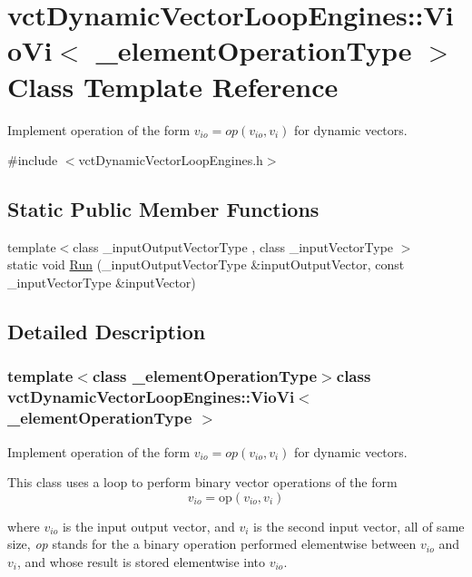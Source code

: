 \hypertarget{classvct_dynamic_vector_loop_engines_1_1_vio_vi}{\section{vct\-Dynamic\-Vector\-Loop\-Engines\-:\-:Vio\-Vi$<$ \-\_\-element\-Operation\-Type $>$ Class Template Reference}
\label{classvct_dynamic_vector_loop_engines_1_1_vio_vi}
}


Implement operation of the form $v_{io} = op(v_{io}, v_i)$ for dynamic vectors.  




{\ttfamily \#include $<$vct\-Dynamic\-Vector\-Loop\-Engines.\-h$>$}

\subsection*{Static Public Member Functions}
\begin{DoxyCompactItemize}
\item 
{\footnotesize template$<$class \-\_\-input\-Output\-Vector\-Type , class \-\_\-input\-Vector\-Type $>$ }\\static void \hyperlink{classvct_dynamic_vector_loop_engines_1_1_vio_vi_ae0a793b8eb6981b09ec9257a2bd144f9}{Run} (\-\_\-input\-Output\-Vector\-Type \&input\-Output\-Vector, const \-\_\-input\-Vector\-Type \&input\-Vector)
\end{DoxyCompactItemize}


\subsection{Detailed Description}
\subsubsection*{template$<$class \-\_\-element\-Operation\-Type$>$class vct\-Dynamic\-Vector\-Loop\-Engines\-::\-Vio\-Vi$<$ \-\_\-element\-Operation\-Type $>$}

Implement operation of the form $v_{io} = op(v_{io}, v_i)$ for dynamic vectors. 

This class uses a loop to perform binary vector operations of the form \[ v_{io} = \mathrm{op}(v_{io}, v_{i}) \]

where $v_{io}$ is the input output vector, and $v_{i}$ is the second input vector, all of same size, {\itshape op} stands for the a binary operation performed elementwise between $v_{io}$ and $v_{i}$, and whose result is stored elementwise into $v_{io}$.


